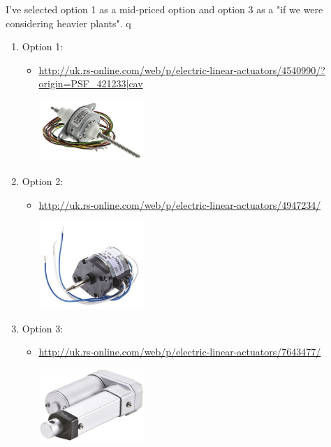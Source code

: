\documentclass[11pt]{article}
\begin{document}
I've selected option 1 as a mid-priced option and option 3 as a "if we were considering heavier plants". 
q
\begin{enumerate}
\item Option 1:
\label{sec-1-1-2-1}

\begin{itemize}
\item \url{http://uk.rs-online.com/web/p/electric-linear-actuators/4540990/?origin=PSF_421233|cav}

\includegraphics[width=150px]{./images/act1.jpg}
\end{itemize}


\item Option 2:
\label{sec-1-1-2-2}

\begin{itemize}
\item \url{http://uk.rs-online.com/web/p/electric-linear-actuators/4947234/}

\includegraphics[width=150px]{./images/act2.jpg}
\end{itemize}

\item Option 3:
\label{sec-1-1-2-3}

\begin{itemize}
\item \url{http://uk.rs-online.com/web/p/electric-linear-actuators/7643477/}

\includegraphics[width=150px]{./images/act3.jpg}
\end{itemize}
\end{enumerate}
\end{document}
